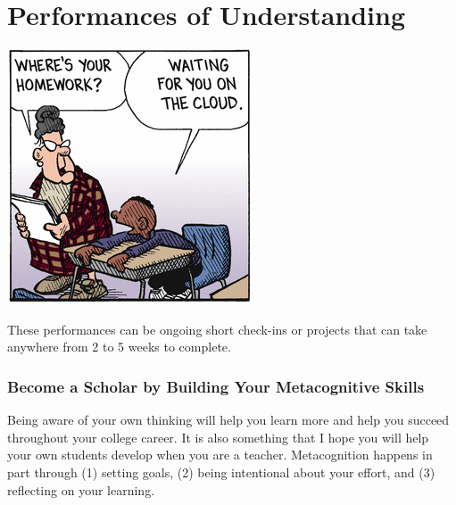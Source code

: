 \documentclass{tufte-handout}
\begin{document}
\newpage

\part{Performances of Understanding}

\begin{marginfigure}%
	\begin{center}
		\includegraphics[width=1\linewidth]{frazz-homework.png}
	\end{center}
\end{marginfigure}

 These performances can be ongoing short check-ins or projects that can take anywhere from 2 to 5 weeks to complete.

\section{Become a Scholar by Building Your Metacognitive Skills}
 Being aware of your own thinking will help you learn more and help you succeed throughout your college career. It is also something that I hope you will help your own students develop when you are a teacher. Metacognition happens in part through (1) setting goals, (2) being intentional about your effort, and (3) reflecting on your learning.
\end{document}
